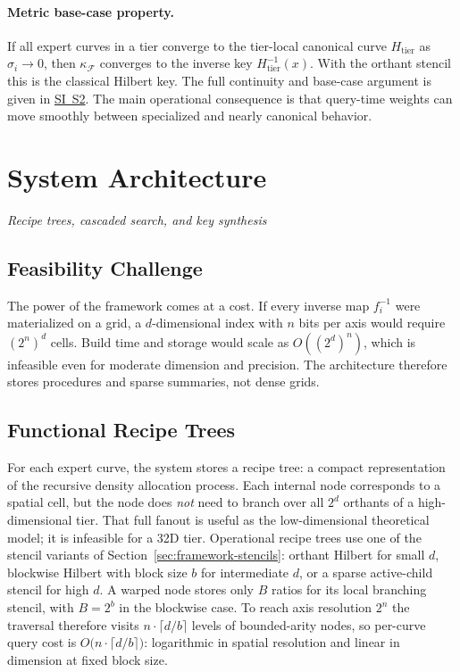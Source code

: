 \documentclass[11pt]{article}
\newcommand{\sectionsubtitle}[1]{\vspace{-0.25em}\noindent\textit{#1}\par\vspace{0.75em}}
\newcommand{\kappaf}{\kappa_{\mathcal F}}
\begin{document}
\paragraph{Metric base-case property.}
If all expert curves in a tier converge to the tier-local canonical curve $H_{\mathrm{tier}}$ as $\sigma_i\to0$, then $\kappaf$ converges to the inverse key $H_{\mathrm{tier}}^{-1}(x)$. With the orthant stencil this is the classical Hilbert key. The full continuity and base-case argument is given in \hyperref[sec:si-global-metric]{SI~S2}. The main operational consequence is that query-time weights can move smoothly between specialized and nearly canonical behavior.

\section{System Architecture}
\label{sec:architecture}
\sectionsubtitle{Recipe trees, cascaded search, and key synthesis}

\subsection{Feasibility Challenge}
The power of the framework comes at a cost. If every inverse map $f_i^{-1}$ were materialized on a grid, a $d$-dimensional index with $n$ bits per axis would require $(2^n)^d$ cells. Build time and storage would scale as $O((2^d)^n)$, which is infeasible even for moderate dimension and precision. The architecture therefore stores procedures and sparse summaries, not dense grids.

\subsection{Functional Recipe Trees}
For each expert curve, the system stores a recipe tree: a compact representation of the recursive density allocation process. Each internal node corresponds to a spatial cell, but the node does \emph{not} need to branch over all $2^d$ orthants of a high-dimensional tier. That full fanout is useful as the low-dimensional theoretical model; it is infeasible for a 32D tier. Operational recipe trees use one of the stencil variants of Section~\ref{sec:framework-stencils}: orthant Hilbert for small $d$, blockwise Hilbert with block size $b$ for intermediate $d$, or a sparse active-child stencil for high $d$. A warped node stores only $B$ ratios for its local branching stencil, with $B=2^b$ in the blockwise case. To reach axis resolution $2^n$ the traversal therefore visits $n\cdot\lceil d/b\rceil$ levels of bounded-arity nodes, so per-curve query cost is $O\bigl(n\cdot\lceil d/b\rceil\bigr)$: logarithmic in spatial resolution and linear in dimension at fixed block size.
\end{document}
